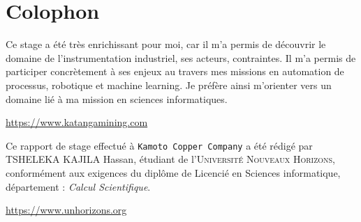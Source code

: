 
\pagestyle{empty}

\hfill

\vfill


\section*{Colophon}
Ce stage a été très enrichissant pour moi, car il m'a permis de découvrir le domaine de l'instrumentation industriel, ses acteurs, contraintes. Il m'a permis de participer concrètement à ses enjeux au travers mes missions en automation de processus, robotique et machine learning. Je préfère ainsi m'orienter vers un domaine lié à ma mission en sciences informatiques.




\begin{center}
\url{https://www.katangamining.com}
\end{center}
Ce rapport de stage effectué à \texttt{Kamoto Copper Company} a été rédigé par {TSHELEKA KAJILA Hassan}, étudiant de l'\textsc{Université Nouveaux Horizons}, conformément aux exigences du diplôme de Licencié en Sciences informatique, département : \emph{Calcul Scientifique}.


\begin{center}
\url{https://www.unhorizons.org}
\end{center}
 
\bigskip

\noindent\finalVersionString
